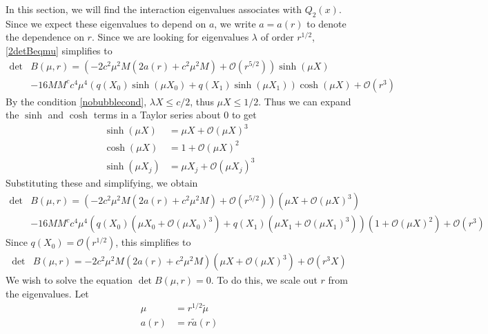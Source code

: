 \documentclass[thesis.tex]{subfiles}
\begin{document}
In this section, we will find the interaction eigenvalues associates with $Q_2(x)$. Since we expect these eigenvalues to depend on $a$, we write $a = a(r)$ to denote the dependence on $r$. Since we are looking for eigenvalues $\lambda$ of order $r^{1/2}$, \cref{2detBeqmu} simplifies to
\begin{equation}\label{2detBint1}
\begin{aligned}
\det &B(\mu, r) = \left(-2 c^2 \mu^2 M (2a(r) + c^2 \mu^2 M) +  \mathcal{O}( r^{5/2} )\right) \sinh(\mu X) \\
&-16 M M^c c^4 \mu^4 ( q(X_0) \sinh(\mu X_0) + q(X_1) \sinh(\mu X_1) ) \cosh(\mu X) + \mathcal{O}( r^3 ) 
\end{aligned}
\end{equation}
By the condition \cref{nobubblecond}, $\lambda X \leq c/2$, thus $\mu X \leq 1/2$. Thus we can expand the $\sinh$ and $\cosh$ terms in a Taylor series about 0 to get
\begin{align*}
\sinh(\mu X) &= \mu X + \mathcal{O}\left(\mu X \right)^3 \\
\cosh(\mu X) &= 1 + \mathcal{O}\left(\mu X\right)^2 \\
\sinh(\mu X_j) &= \mu X_j + \mathcal{O}\left(\mu X_j \right)^3
\end{align*}
Substituting these and simplifying, we obtain 
\begin{equation}\label{2detBint2}
\begin{aligned}
\det &B(\mu, r) = \left(-2 c^2 \mu^2 M (2a(r) + c^2 \mu^2 M) +  \mathcal{O}( r^{5/2} )\right) \left(\mu X + \mathcal{O}\left(\mu X \right)^3 \right) \\
&-16 M M^c c^4 \mu^4 \left( q(X_0)\left( \mu X_0 + \mathcal{O}(\mu X_0)^3 \right)  + q(X_1)\left( \mu X_1 + \mathcal{O}(\mu X_1) ^3 \right) \right) \left( 1 + \mathcal{O}(\mu X)^2 \right) + \mathcal{O}( r^3 )
\end{aligned}
\end{equation}
Since $q(X_0) = \mathcal{O}(r^{1/2})$, this simplifies to 
\begin{equation}\label{2detBint2}
\begin{aligned}
\det &B(\mu, r) = -2 c^2 \mu^2 M (2a(r) + c^2 \mu^2 M)\left( \mu X + \mathcal{O}\left(\mu X \right)^3 \right)
+ \mathcal{O}( r^3 X ) 
\end{aligned}
\end{equation}
We wish to solve the equation $\det B(\mu, r) = 0$. To do this, we scale out $r$ from the eigenvalues. Let
\begin{align*}
\mu &= r^{1/2}\tilde{\mu} \\
a(r) &= r \tilde{a}(r)
\end{align*}
\end{document}
